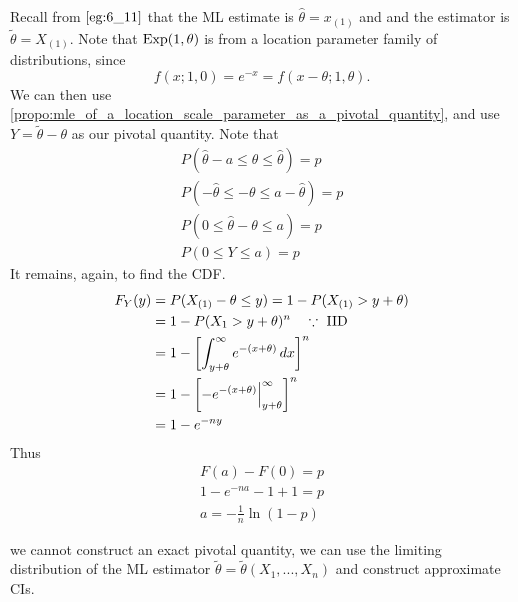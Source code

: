 \documentclass[notoc,notitlepage]{tufte-book}
\begin{document}
\begin{solution}
  Recall from $\cref{eg:6_11}$ that the ML estimate is $\hat{\theta} = x_{(1)}$ and and the estimator is $\tilde{\theta} = X_{(1)}$. Note that $\operatorname{Exp}(1, \theta)$ is from a location parameter family of distributions, since
  \begin{equation*}
    f(x; 1, 0) = e^{-x} = f(x - \theta; 1, \theta).
  \end{equation*}
  We can then use \cref{propo:mle_of_a_location_scale_parameter_as_a_pivotal_quantity}, and use $Y = \tilde{\theta} - \theta$ as our pivotal quantity. Note that
  \begin{gather*}
    P\left( \hat{\theta} - a \leq \theta \leq \hat{\theta} \right) = p \\
    P( - \hat{\theta} \leq - \theta \leq a - \hat{\theta} ) = p \\
    P( 0 \leq \hat{\theta} - \theta \leq a ) = p \\
    P( 0 \leq Y \leq a ) = p
  \end{gather*}
  It remains, again, to find the CDF.
  \begin{align*}
    F_Y(y) &= P(X_{(1)} - \theta \leq y) = 1 - P(X_{(1)} > y + \theta) \\
           &= 1 - P(X_1 > y + \theta)^n \quad \because \text{ IID } \\
           &= 1 - \left[ \int_{y + \theta}^{\infty}e^{-(x + \theta)} \mathop{}\!d{x} \right]^n \\
           &= 1 - \left[ - e^{-(x + \theta)} \Big|_{y + \theta}^{\infty} \right]^n \\
           &= 1 - e^{-ny}
  \end{align*}
  Thus
  \begin{gather*}
    F(a) - F(0) = p \\
    1 - e^{-na} - 1 + 1 = p \\
    a = - \frac{1}{n} \ln (1 - p)
  \end{gather*}
\end{solution}

 we cannot construct an exact pivotal quantity, we can use the limiting distribution of the ML estimator $\tilde{\theta} = \tilde{\theta}(X_1, ..., X_n)$ and construct approximate CIs.
\end{document}
